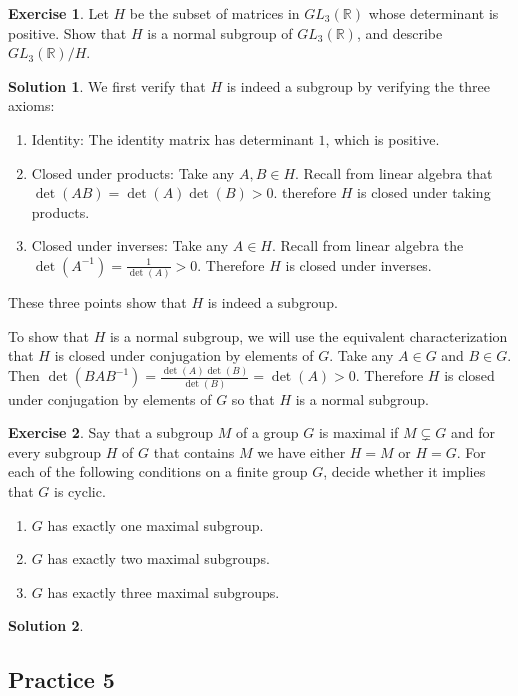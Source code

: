 \documentclass[12pt]{article}
\theoremstyle{definition}
\newcommand{\R}{\mathbb{R}}
\newtheorem{exercise}{\color{YellowOrange}Exercise}
\theoremstyle{definition}
\newtheorem{solution}{\color{Goldenrod}Solution}
\begin{document}
\begin{exercise}
Let $H$ be the subset of matrices in $GL_3(\R)$ whose determinant is positive. Show that $H$ is a normal subgroup of $GL_3(\R)$, and describe $GL_3(\R) / H$.
\end{exercise}
\begin{solution}
We first verify that $H$ is indeed a subgroup by verifying the three axioms:
\begin{enumerate}
	\item Identity: The identity matrix has determinant $1$, which is positive. 
	\item Closed under products: Take any $A, B \in H$. Recall from linear algebra that $\det(AB) = \det(A)\det(B) > 0$. therefore $H$ is closed under taking products. 
	\item Closed under inverses: Take any $A \in H$. Recall from linear algebra the $\det(A^{-1}) = \frac{1}{\det(A)} > 0$. Therefore $H$ is closed under inverses. 
\end{enumerate}
These three points show that $H$ is indeed a subgroup. 

To show that $H$ is a normal subgroup, we will use the equivalent characterization that $H$ is closed under conjugation by elements of $G$. Take any $A \in G$ and $B \in G$. Then $\det(BAB^{-1}) = \frac{\det(A)\det(B)}{\det(B)} = \det(A) > 0$. Therefore $H$ is closed under conjugation by elements of $G$ so that $H$ is a normal subgroup.   
\end{solution}	

\begin{exercise}
Say that a subgroup $M$ of a group $G$ is maximal if $M \subsetneq G$ and for every subgroup $H$ of $G$ that contains $M$ we have either $H = M$ or $H = G$. For each of the following conditions on a finite group $G$, decide whether it implies that $G$ is cyclic.
\begin{enumerate}
	\item $G$ has exactly one maximal subgroup.
	\item $G$ has exactly two maximal subgroups. 
	\item $G$ has exactly three maximal subgroups. 
\end{enumerate} 
\end{exercise}
\begin{solution}

\end{solution}

\subsection{Practice 5}
\end{document}
